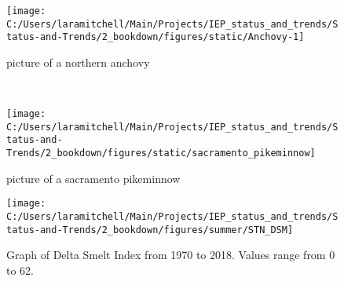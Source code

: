\documentclass[
]{book}
\begin{document}
\begin{panel-grid}
\begin{columns-nocenter}
\begin{column800}

\begin{figure}

{\centering \texttt{[image: C:/Users/laramitchell/Main/Projects/IEP\_status\_and\_trends/Status-and-Trends/2\_bookdown/figures/static/Anchovy-1]} 

}

\caption{picture of a northern anchovy}\label{fig:unnamed-chunk-77}
\end{figure}

\end{column800}

\begin{column40}

~

\end{column40}

\begin{column800}

\begin{figure}

{\centering \texttt{[image: C:/Users/laramitchell/Main/Projects/IEP\_status\_and\_trends/Status-and-Trends/2\_bookdown/figures/static/sacramento\_pikeminnow]} 

}

\caption{picture of a sacramento pikeminnow}\label{fig:unnamed-chunk-78}
\end{figure}

\end{column800}

\end{columns-nocenter}

\begin{columns-nocenter}

\begin{column800}

\begin{expand}

\begin{figure}
\texttt{[image: C:/Users/laramitchell/Main/Projects/IEP\_status\_and\_trends/Status-and-Trends/2\_bookdown/figures/summer/STN\_DSM]} \caption{Graph of Delta Smelt Index from 1970 to 2018. Values range from 0 to 62.}\label{fig:unnamed-chunk-79}
\end{figure}

\end{expand}

\end{column800}


\end{columns-nocenter}
\end{panel-grid}
\end{document}
